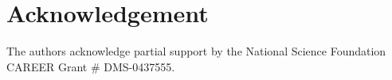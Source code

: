 
\section*{Acknowledgement}

The authors acknowledge partial support by the National Science Foundation
CAREER Grant \# DMS-0437555.
\\
